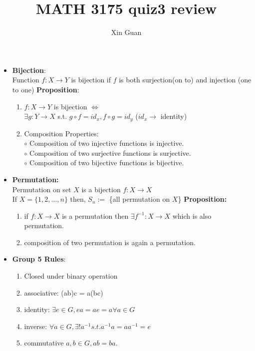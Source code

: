 \documentclass[12pt]{article}
\title{MATH 3175 quiz3 review}
\date{}
\author{Xin Guan}
\begin{document}
    \begin{itemize}
        \item \textbf{Bijection}: \\
        Function $f: X \rightarrow Y$ is bijection if $f$ is both surjection(on to) and injection (one to one)
        \textbf{Proposition}:
        \begin{enumerate}
            \item $f: X \rightarrow Y$ is bijection $\Leftrightarrow$\\
            $\exists g: Y \rightarrow X$ s.t. $g \circ f = id_x, f \circ g = id_y$ ($id_x \rightarrow$ identity)
            \item Composition Properties:\\
            $\circ$ Composition of two injective functions is injective. \\
            $\circ$ Composition of two surjective functions is surjective.\\
            $\circ$ Composition of two bijective functions is bijective.
        \end{enumerate}
        \item \textbf{Permutation:}\\
        Permutation on set $X$ is a bijection $f : X \rightarrow X$\\
        If $X = \{1,2,\dots,n\}$ then, $S_n :=$ \{all permutation on $X$\} 
        \textbf{Proposition:}
        \begin{enumerate}
            \item if $f: X \rightarrow X$ is a permutation then $\exists f^{-1}: X \rightarrow X$ which is also permutation.
            \item composition of two permutation is again a permutation.
        \end{enumerate}
        \item \textbf{Group 5 Rules}:
        \begin{enumerate}
            \item Closed under binary operation
            \item associative: (ab)c = a(bc)
            \item identity: $\exists e \in G, ea = ae = a \forall a \in G$
            \item inverse: $\forall a \in G, \exists! a^{-1} s.t. a^{-1}a = aa^{-1} = e$
            \item commutative $a,b \in G, ab = ba$.
        \end{enumerate}

\end{itemize}
\end{document}
